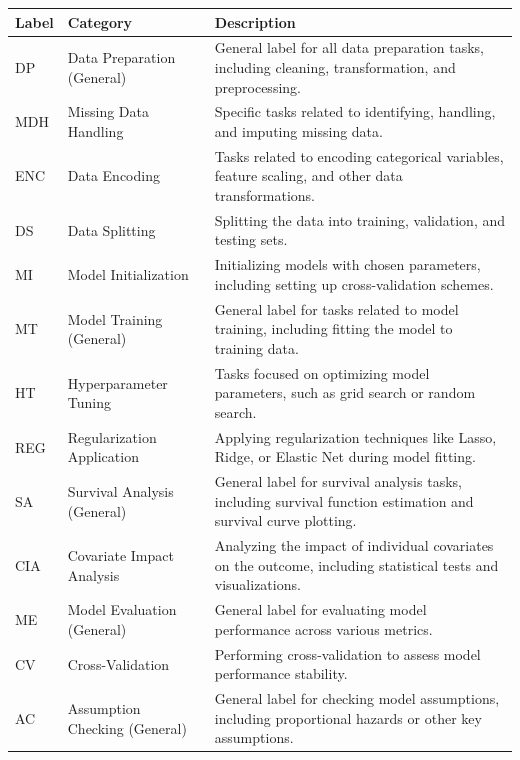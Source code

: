 \begin{table}[h!]
    \centering
    \begin{tabular}{|l|l|p{10cm}|}
    \hline
    \textbf{Label} & \textbf{Category} & \textbf{Description} \\ \hline
    DP   & Data Preparation (General)   & General label for all data preparation tasks, including cleaning, transformation, and preprocessing. \\ \hline
    MDH  & Missing Data Handling        & Specific tasks related to identifying, handling, and imputing missing data. \\ \hline
    ENC  & Data Encoding                & Tasks related to encoding categorical variables, feature scaling, and other data transformations. \\ \hline
    DS   & Data Splitting               & Splitting the data into training, validation, and testing sets. \\ \hline
    MI   & Model Initialization         & Initializing models with chosen parameters, including setting up cross-validation schemes. \\ \hline
    MT   & Model Training (General)     & General label for tasks related to model training, including fitting the model to training data. \\ \hline
    HT   & Hyperparameter Tuning        & Tasks focused on optimizing model parameters, such as grid search or random search. \\ \hline
    REG  & Regularization Application   & Applying regularization techniques like Lasso, Ridge, or Elastic Net during model fitting. \\ \hline
    SA   & Survival Analysis (General)  & General label for survival analysis tasks, including survival function estimation and survival curve plotting. \\ \hline
    CIA  & Covariate Impact Analysis    & Analyzing the impact of individual covariates on the outcome, including statistical tests and visualizations. \\ \hline
    ME   & Model Evaluation (General)   & General label for evaluating model performance across various metrics. \\ \hline
    CV   & Cross-Validation             & Performing cross-validation to assess model performance stability. \\ \hline
    AC   & Assumption Checking (General) & General label for checking model assumptions, including proportional hazards or other key assumptions. \\ \hline

\end{tabular}
\end{table}
